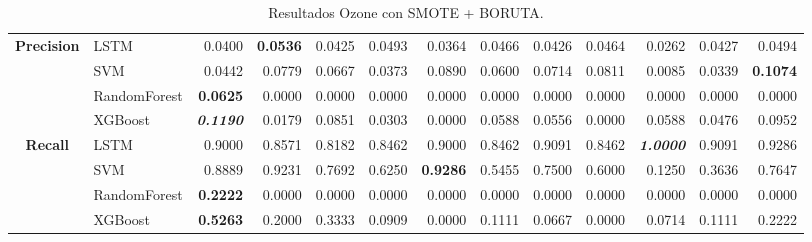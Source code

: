 \begin{table}[H]
\begin{adjustbox}{max width=12cm}
\begin{tabular}{|c|l|r|r|r|r|r|r|r|r|r|r|r|}
			\hline
			\textbf{Precision} &  LSTM &  0.0400 & \textbf{  0.0536 } &  0.0425 &  0.0493 &  0.0364 &  0.0466 &  0.0426 &  0.0464 &  0.0262 &  0.0427 &  0.0494 \\
			&  SVM &  0.0442 &  0.0779 &  0.0667 &  0.0373 &  0.0890 &  0.0600 &  0.0714 &  0.0811 &  0.0085 &  0.0339 & \textbf{  0.1074 } \\
			&  RandomForest & \textbf{  0.0625 } &  0.0000 &  0.0000 &  0.0000 &  0.0000 &  0.0000 &  0.0000 &  0.0000 &  0.0000 &  0.0000 &  0.0000 \\
			&  XGBoost & \textit{ \textbf{  0.1190 } } &  0.0179 &  0.0851 &  0.0303 &  0.0000 &  0.0588 &  0.0556 &  0.0000 &  0.0588 &  0.0476 &  0.0952 \\
			\hline
			\textbf{Recall} &  LSTM &  0.9000 &  0.8571 &  0.8182 &  0.8462 &  0.9000 &  0.8462 &  0.9091 &  0.8462 & \textit{ \textbf{  1.0000 } } &  0.9091 &  0.9286 \\
			&  SVM &  0.8889 &  0.9231 &  0.7692 &  0.6250 & \textbf{  0.9286 } &  0.5455 &  0.7500 &  0.6000 &  0.1250 &  0.3636 &  0.7647 \\
			&  RandomForest & \textbf{  0.2222 } &  0.0000 &  0.0000 &  0.0000 &  0.0000 &  0.0000 &  0.0000 &  0.0000 &  0.0000 &  0.0000 &  0.0000 \\
			&  XGBoost & \textbf{  0.5263 } &  0.2000 &  0.3333 &  0.0909 &  0.0000 &  0.1111 &  0.0667 &  0.0000 &  0.0714 &  0.1111 &  0.2222 \\
			\hline
		\end{tabular}
	\end{adjustbox}
	\caption{Resultados Ozone con SMOTE + BORUTA.}
	\label{tab:Ozone_SMOTE_BORUTA}
\end{table}


